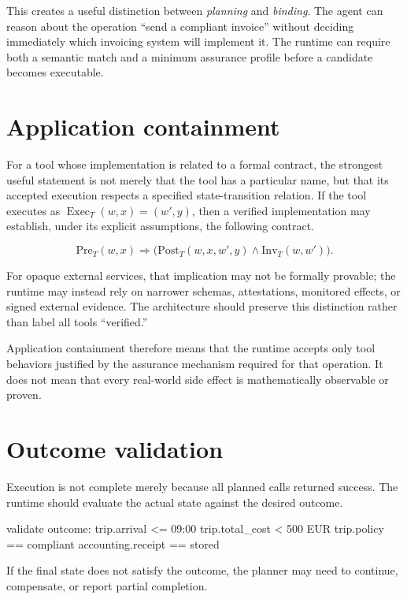 \documentclass[10pt,oneside,openany]{book}
\begin{document}
This creates a useful distinction between \emph{planning} and \emph{binding}. The agent can reason about the operation ``send a compliant invoice'' without deciding immediately which invoicing system will implement it. The runtime can require both a semantic match and a minimum assurance profile before a candidate becomes executable.

\section{Application containment}
For a tool whose implementation is related to a formal contract, the strongest useful statement is not merely that the tool has a particular name, but that its accepted execution respects a specified state-transition relation. If the tool executes as $\operatorname{Exec}_T(w,x)=(w',y)$, then a verified implementation may establish, under its explicit assumptions, the following contract.
\begin{formulabox}
\[
\mathrm{Pre}_T(w,x)\Rightarrow
\bigl(\mathrm{Post}_T(w,x,w',y)\land\mathrm{Inv}_T(w,w')\bigr).
\]
\end{formulabox}
For opaque external services, that implication may not be formally provable; the runtime may instead rely on narrower schemas, attestations, monitored effects, or signed external evidence. The architecture should preserve this distinction rather than label all tools ``verified.''

Application containment therefore means that the runtime accepts only tool behaviors justified by the assurance mechanism required for that operation. It does not mean that every real-world side effect is mathematically observable or proven.

\section{Outcome validation}
Execution is not complete merely because all planned calls returned success. The runtime should evaluate the actual state against the desired outcome.

\begin{codeblock}
validate outcome:
  trip.arrival <= 09:00
  trip.total_cost < 500 EUR
  trip.policy == compliant
  accounting.receipt == stored
\end{codeblock}

If the final state does not satisfy the outcome, the planner may need to continue, compensate, or report partial completion.
\end{document}
